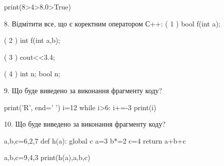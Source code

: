 \documentclass[11pt]{article}
\begin{document}
print(8>4>8.0>True)
\vspace{5mm}

8. %
Відмітити все, що є коректним оператором С++:
( 1 ) bool f(int a);

( 2 ) int f(int a,b);

( 3 ) cout<<3.4;

( 4 ) int n; bool n;
\vspace{5mm}

9. Що буде виведено за виконання фрагменту коду?

print('R', end=' ')
i=12
while i>6:
    i+=-3
print(i)

\vspace{5mm}

10. Що буде виведено за виконання фрагменту коду?

a,b,c=6,2,7
def h(a):
global c    a=3
    b*=2
    c=4
    return a+b+c

a,b,c=9,4,3
print(h(a),a,b,c)
\vspace{5mm}

\newpage
\end{document}
